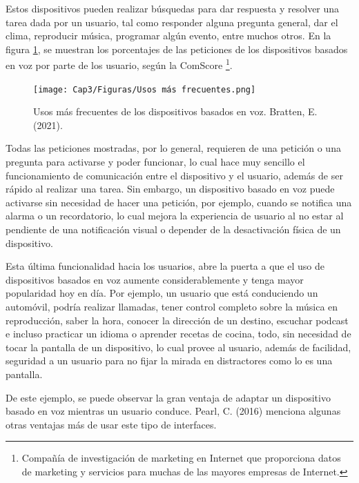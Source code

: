 Estos dispositivos pueden realizar búsquedas para dar respuesta y resolver una tarea dada por un usuario, tal como responder alguna pregunta general, dar el clima, reproducir música, programar algún evento, entre muchos otros. En la figura \ref{fig:32}, se muestran los porcentajes de las peticiones de los dispositivos basados en voz por parte de los usuario, según la ComScore \footnote{Compañía de investigación de marketing en Internet que proporciona datos de marketing y servicios para muchas de las mayores empresas de Internet.}.

\begin{figure}
  \centering
  \texttt{[image: Cap3/Figuras/Usos más frecuentes.png]}
  \caption{Usos más frecuentes de los dispositivos basados en voz. Bratten, E. (2021).}
  \label{fig:32}
\end{figure}

Todas las peticiones mostradas, por lo general, requieren de una petición o una pregunta para activarse y poder funcionar, lo cual hace muy sencillo el funcionamiento de comunicación entre el dispositivo y el usuario, además de ser rápido al realizar una tarea. Sin embargo, un dispositivo basado en voz puede activarse sin necesidad de hacer una petición, por ejemplo, cuando se notifica una alarma o un recordatorio, lo cual mejora la experiencia de usuario al no estar al pendiente de una notificación visual o depender de la desactivación física de un dispositivo.

Esta última funcionalidad hacia los usuarios, abre la puerta a que el uso de dispositivos basados en voz aumente considerablemente y tenga mayor popularidad hoy en día. Por ejemplo, un usuario que está conduciendo un automóvil, podría realizar llamadas, tener control completo sobre la música en reproducción, saber la hora, conocer la dirección de un destino, escuchar podcast e incluso practicar un idioma o aprender recetas de cocina, todo, sin necesidad de tocar la pantalla de un dispositivo, lo cual provee al usuario, además de facilidad, seguridad a un usuario para no fijar la mirada en distractores como lo es una pantalla.

De este ejemplo, se puede observar la gran ventaja de adaptar un dispositivo basado en voz mientras un usuario conduce. Pearl, C. (2016) menciona algunas otras ventajas más de usar este tipo de interfaces.

